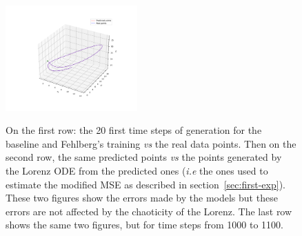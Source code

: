 \documentclass{article}
\begin{document}
\begin{figure}[thb]
  \includegraphics[width=0.45\textwidth]{./figs/fehlberg_vs_recover_1000_to_1100.pdf}\\
  \caption{On the first row: the 20 first time steps of generation for
    the baseline and Fehlberg's training \textit{vs} the real data
    points. Then on the second row, the same predicted points
    \textit{vs} the points generated by the Lorenz ODE from the
    predicted ones (\textit{i.e} the ones used to estimate the
    modified MSE as described in section~\ref{sec:first-exp}). These
    two figures show the errors made by the models but these errors
    are not affected by the chaoticity of the Lorenz. The last row
    shows the same two figures, but for time steps from 1000 to 1100.}
  \label{fig:generations}
\end{figure}
\end{document}
